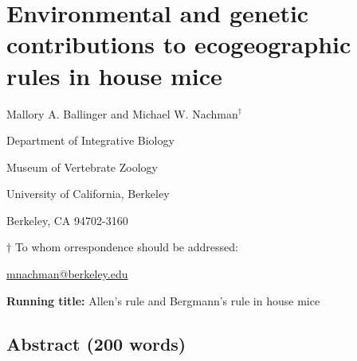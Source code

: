 \documentclass[]{article}
\author{}
\date{\vspace{-2.5em}}
\begin{document}
\hypertarget{environmental-and-genetic-contributions-to-ecogeographic-rules-in-house-mice}{%
\section{Environmental and genetic contributions to ecogeographic rules
in house
mice}\label{environmental-and-genetic-contributions-to-ecogeographic-rules-in-house-mice}}

\vspace{20mm}

Mallory A. Ballinger and Michael W. Nachman\({^\dagger}\)

\vspace{20mm}

Department of Integrative Biology

Museum of Vertebrate Zoology

University of California, Berkeley

Berkeley, CA 94702-3160

\vspace{10mm}

\({\dagger}\) To whom orrespondence should be addressed:

\href{mailto:mnachman@berkeley.edu}{mnachman@berkeley.edu}

\vspace{40mm}

\textbf{Running title:} Allen's rule and Bergmann's rule in house mice

\newpage

\hypertarget{abstract-200-words}{%
\subsection{Abstract (200 words)}\label{abstract-200-words}}
\end{document}
